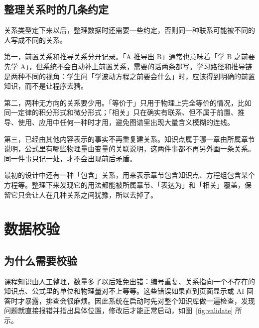 \documentclass[UTF8,a4paper,zihao=-4]{ctexart}
\begin{document}
\subsection{整理关系时的几条约定}

关系类型定下来以后，整理数据时还需要一些约定，否则同一种联系可能被不同的人写成不同的关系。

第一，前置关系和推导关系分开记录。「A 推导出 B」通常也意味着「学 B 之前要先学 A」，但系统不会自动补上前置关系，需要的话两条都写。学习路径和推导链是两种不同的视角：学生问「学波动方程之前要会什么」时，应该得到明确的前置知识，而不是让程序去猜。

第二，两种无方向的关系要少用。「等价于」只用于物理上完全等价的情况，比如同一定律的积分形式和微分形式；「相关」只在确实有联系、但不属于前置、推导、使用、应用中任何一种时才用，避免图谱里出现大量含义模糊的连线。

第三，已经由其他内容表示的事实不再重复建关系。知识点属于哪一章由所属章节说明，公式里有哪些物理量由变量的关联说明，这两件事都不再另外画一条关系。同一件事只记一处，才不会出现前后矛盾。

最初的设计中还有一种「包含」关系，用来表示章节包含知识点、方程组包含某个方程等。整理下来发现它的用法都能被所属章节、「表达为」和「相关」覆盖，保留它只会让人在几种关系之间犹豫，所以去掉了。

\section{数据校验}

\subsection{为什么需要校验}

课程知识由人工整理，数量多了以后难免出错：编号重复、关系指向一个不存在的知识点、公式里的单位和物理量对不上等等。这些错误如果直到页面显示或 AI 回答时才暴露，排查会很麻烦。因此系统在启动时先对整个知识库做一遍检查，发现问题就直接报错并指出具体位置，修改后才能正常启动，如图~\ref{fig:validate} 所示。
\end{document}
